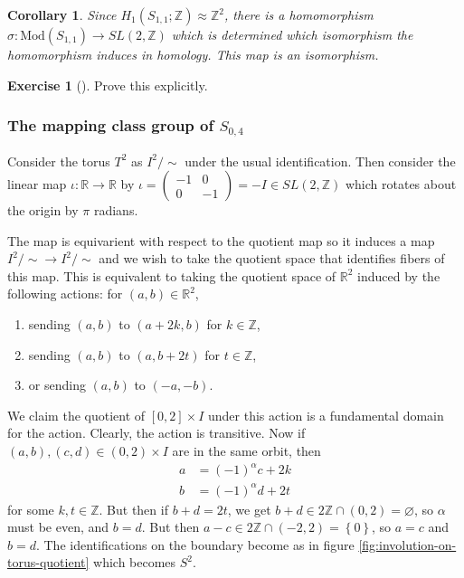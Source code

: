 \documentclass[reqno]{amsart}
\newtheorem{corollary}[theorem]{Corollary}
\theoremstyle{definition}
\newtheorem{exercise}[theorem]{Exercise}
\theoremstyle{remark}
\newcommand{\Mod}{{\mathrm{Mod}}}
\begin{document}
\begin{corollary}
    Since $H_1 \left( S_{1,1}; \mathbb{Z} \right) \approx
    \mathbb{Z}^2$, there is a homomorphism
    $\sigma \colon \Mod \left( S_{1,1} \right) \to 
    SL(2, \mathbb{Z})$ which is determined
    which isomorphism the homomorphism induces in
    homology. This map is an isomorphism.
\end{corollary}

\begin{exercise}[]
    Prove this explicitly.
\end{exercise}

\subsubsection*{The mapping class group of
$S_{0,4}$}

Consider the torus $T^2$ as $I^2 / \sim$ under the usual
identification. Then consider the
linear map $\iota \colon \mathbb{R} \to \mathbb{R}$ 
by
$\iota = \begin{pmatrix} -1 & 0\\ 0 & -1 \end{pmatrix} 
= - I
\in SL(2, \mathbb{Z})$ which rotates about the origin
by $\pi$ radians.

The map is equivarient with respect to the quotient map
so it induces a map $I^2 / \sim \to I^2 / \sim$
and we wish to take the quotient space that identifies
fibers of this map. This is equivalent to taking
the quotient space of $\mathbb{R}^2$ induced by the
following actions: for $\left( a,b \right) \in \mathbb{R}^2$,
\begin{enumerate}
    \item sending $(a,b)$ to $(a+2k,b)$ for $k \in \mathbb{Z}$,
    \item sending $(a,b)$ to $(a, b+ 2t)$ for $t \in \mathbb{Z}$,
    \item or sending $(a,b)$ to $(-a, -b)$.
\end{enumerate}
We claim the quotient of $\left[ 0,2 \right] \times I $ 
under this action
is a fundamental domain for the action.
Clearly, the action is transitive. Now
if $(a,b),(c,d) \in (0,2) \times I $ are in the same orbit,
then
\begin{align*}
    a &= (-1)^{\alpha} c + 2k \\
    b &= (-1)^{\alpha} d + 2t
\end{align*}
for some $k,t \in \mathbb{Z}$. But then
if $b+d = 2t$, we  get $b+d \in 2 \mathbb{Z} \cap \left( 0,2 \right) 
= \varnothing$, so $\alpha$ must be even, and
$b = d$. But then
$a-c \in  2\mathbb{Z} \cap \left( -2, 2 \right) =
\left\{ 0 \right\} $, so $a=c$ and $b=d$.
The identifications on the boundary become as in figure
\ref{fig:involution-on-torus-quotient} which becomes
$S^2$.
\end{document}
